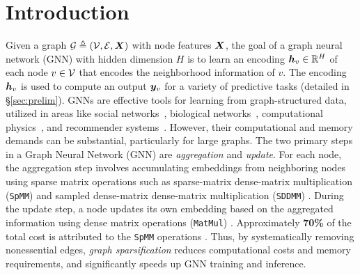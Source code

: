 \section{Introduction}
\label{sec:Intro}

Given a graph ${\mathcal{G}} \triangleq ({\mathcal{V}}, {\mathcal{E}}, {\bm{X}})$ with node features ${\bm{X}}$, the goal of a graph neural network (GNN) with hidden dimension $H$ is to learn an encoding ${\bm{h}}_v \in \mathbb{R}^H$ of each node $v \in {\mathcal{V}}$ that encodes the neighborhood information of $v$. The encoding ${\bm{h}}_v$ is used to compute an output ${\bm{y}}_v$ for a variety of predictive tasks (detailed in \S\ref{sec:prelim}). 
GNNs \cite{GNNBook2022,zhou2020graph} are effective tools for learning from graph-structured data, utilized in areas like social networks~\cite{wu2021self}, biological networks~\cite{muzio2021biological}, computational physics~\cite{jessicafinite}, and recommender systems~\cite{yu2022graph}. However, their computational and memory demands can be substantial, particularly for large graphs. 
The two primary steps in a Graph Neural Network (GNN) are \textit{aggregation} and \textit{update}. For each node, the aggregation step involves accumulating embeddings from neighboring nodes using sparse matrix operations such as sparse-matrix dense-matrix multiplication (\texttt{SpMM}) and sampled dense-matrix dense-matrix multiplication (\texttt{SDDMM}) \cite{zhang2024graph}. During the update step, a node updates its own embedding based on the aggregated information using dense matrix operations (\texttt{MatMul}) \cite{zhang2024graph}. 
Approximately \textbf{70\%} of the total cost is attributed to the \texttt{SpMM} operations \cite{liu2023dspar}.
Thus, by systematically removing nonessential edges, \textit{graph sparsification}  \cite{chen2023demystifying, hashemi2024comprehensive} reduces computational costs and memory requirements,  and significantly speeds up GNN training and inference.



